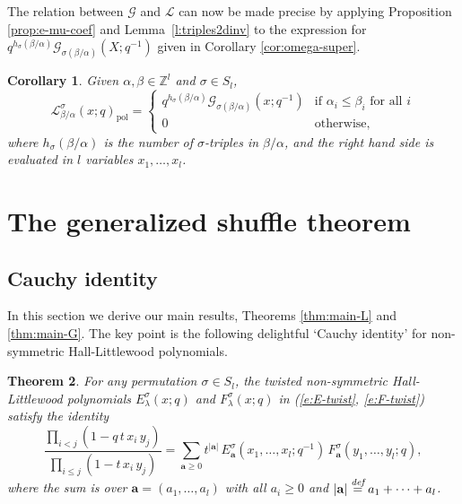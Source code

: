 \documentclass[12pt]{amsart}
\newtheorem{thm}{Theorem}[subsection]
\newtheorem{cor}[thm]{Corollary}
\theoremstyle{definition}
\theoremstyle{remark}
\newcommand{\ZZ}{{\mathbb Z}}
\newcommand{\aA}{{\mathbf a}}
\newcommand{\Gcal}{{\mathcal G}}
\newcommand{\Lcal}{{\mathcal L}}
\DeclareMathOperator{\pol}{pol}
\newcommand{\defeq}{\overset{\text{{\em def}}}{=}}
\begin{document}
The relation between $\Gcal$ and $\Lcal$ can now be made precise by
applying Proposition \ref{prop:e-mu-coef} and
Lemma~\ref{l:triples2dinv} to the expression for $q^{h_{\sigma }(\beta
/\alpha )} \Gcal _{\sigma (\beta /\alpha )}(X;q^{-1})$ given in
Corollary \ref{cor:omega-super}.

\begin{cor}\label{cor:G-versus-L}
Given $\alpha ,\beta \in \ZZ ^{l}$ and $\sigma \in S_{l}$,
\begin{equation}\label{e:G-versus-L}
\Lcal ^{\sigma }_{\beta /\alpha }(x;q)_{\pol } =
\begin{cases}
q^{h_{\sigma }(\beta/\alpha )} \Gcal _{\sigma (\beta /\alpha )}(x;q^{-1}) &
\text{if $\alpha _{i}\leq \beta _{i}$ for all $i$}\\
0 & \text{otherwise},
\end{cases}
\end{equation}
where $h_{\sigma }(\beta /\alpha )$ is the number of $\sigma $-triples
in $\beta /\alpha $, and the right hand side is evaluated in $l$
variables $x_{1},\ldots, x_{l}$.
\end{cor}

\section{The generalized shuffle theorem}
\label{s:main}

\subsection{Cauchy identity}
\label{ss:Cauchy}
In this section we derive our main results, Theorems \ref{thm:main-L}
and \ref{thm:main-G}.  The key point is the following delightful
`Cauchy identity' for non-symmetric Hall-Littlewood polynomials.

\begin{thm}\label{thm:Cauchy}
For any permutation $\sigma \in S_{l}$, the twisted non-symmetric
Hall-Littlewood polynomials $E^{\sigma }_{\lambda }(x;q)$ and
$F^{\sigma }_{\lambda }(x;q)$ in (\ref{e:E-twist}, \ref{e:F-twist})
satisfy the identity
\begin{equation}\label{e:Cauchy}
\frac{\prod _{i<j} (1 - q\, t\, x_{i} \, y_{j})}{\prod _{i\leq j} (1 -
t\, x_{i}\, y_{j})} = \sum _{\aA \geq 0} t^{|\aA |}\, E^{\sigma }_{\aA
}(x_{1},\ldots,x_{l};q^{-1}) \, F^{\sigma }_{\aA
}(y_{1},\ldots,y_{l};q),
\end{equation}
where the sum is over $\aA = (a_{1},\ldots,a_{l})$ with all $a_{i}\geq
0$ and $|\aA | \defeq a_{1}+\cdots +a_{l}$.
\end{thm}
\end{document}
